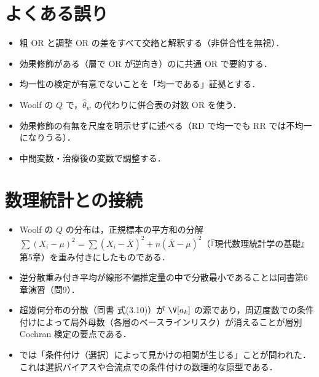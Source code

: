 \section{よくある誤り}\label{sec:07-err}
\begin{warnbox}
\begin{itemize}
\item 粗 OR と調整 OR の差をすべて交絡と解釈する（非併合性を無視）．
\item 効果修飾がある（層で OR が逆向き）のに共通 OR で要約する．
\item 均一性の検定が有意でないことを「均一である」証拠とする．
\item Woolf の $Q$ で，$\hat\theta_w$ の代わりに併合表の対数 OR を使う．
\item 効果修飾の有無を尺度を明示せずに述べる（RD で均一でも RR では不均一になりうる）．
\item 中間変数・治療後の変数で調整する．
\end{itemize}
\end{warnbox}

\section{数理統計との接続}\label{sec:07-link}
\begin{linkbox}
\begin{itemize}
\item Woolf の $Q$ の分布は，正規標本の平方和の分解 $\sum(X_i-\mu)^2=\sum(X_i-\bar X)^2+n(\bar X-\mu)^2$（『現代数理統計学の基礎』第5章）を重み付きにしたものである．
\item 逆分散重み付き平均が線形不偏推定量の中で分散最小であることは同書第6章演習（問9）．
\item 超幾何分布の分散（同書 式(3.10)）が $\V[a_k]$ の源であり，周辺度数での条件付けによって局外母数（各層のベースラインリスク）が消えることが層別 Cochran 検定の要点である．
\item {} では「条件付け（選択）によって見かけの相関が生じる」ことが問われた．これは選択バイアスや合流点での条件付けの数理的な原型である．
\end{itemize}
\end{linkbox}

